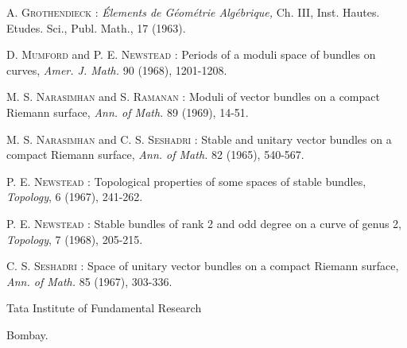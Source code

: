 \begin{thebibliography}{99}
 \textsc{A. Grothendieck :} {\em \'Elements de G\'eom\'etrie Alg\'ebrique,} Ch. III, Inst. Hautes. Etudes. Sci., Publ. Math., 17 (1963).

 \textsc{D. Mumford} and \textsc{P. E. Newstead :} Periods of a moduli space of bundles on curves, {\em Amer. J. Math.} 90 (1968), 1201-1208.

 \textsc{M. S. Narasimhan} and \textsc{S. Ramanan :} Moduli of vector bundles on a compact Riemann surface, {\em Ann. of Math.} 89 (1969), 14-51.

 \textsc{M. S. Narasimhan} and \textsc{C. S. Seshadri :} Stable and unitary vector bundles on a compact Riemann surface, {\em Ann. of Math.} 82 (1965), 540-567.

 \textsc{P. E. Newstead :} Topological properties of some spaces of stable bundles, {\em Topology}, 6 (1967), 241-262.

 \textsc{P. E. Newstead :} Stable bundles of rank 2 and odd degree on a curve of genus 2, {\em Topology}, 7 (1968), 205-215.

 \textsc{C. S. Seshadri :} Space of unitary vector bundles on a compact Riemann surface, {\em Ann. of Math.} 85 (1967), 303-336.
\end{thebibliography}

\noindent
{\small Tata Institute of Fundamental Research}

\noindent
{\small Bombay.}
